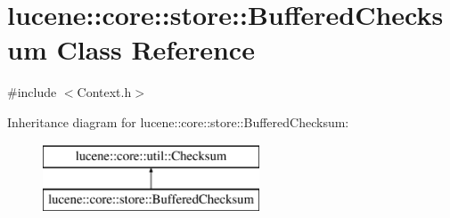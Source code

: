 \hypertarget{classlucene_1_1core_1_1store_1_1BufferedChecksum}{}\section{lucene\+:\+:core\+:\+:store\+:\+:Buffered\+Checksum Class Reference}
\label{classlucene_1_1core_1_1store_1_1BufferedChecksum}


{\ttfamily \#include $<$Context.\+h$>$}

Inheritance diagram for lucene\+:\+:core\+:\+:store\+:\+:Buffered\+Checksum\+:\begin{figure}[H]
\begin{center}
\leavevmode
\includegraphics[height=2.000000cm]{classlucene_1_1core_1_1store_1_1BufferedChecksum}
\end{center}
\end{figure}
